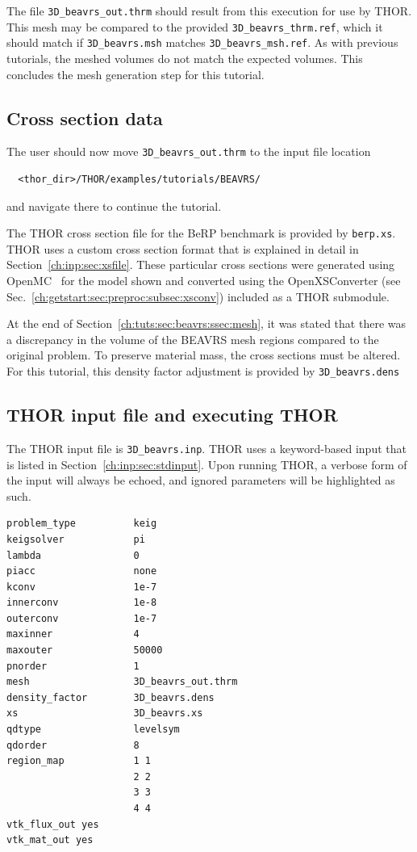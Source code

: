 The file \verb"3D_beavrs_out.thrm" should result from this execution for use by THOR.
This mesh may be compared to the provided \verb"3D_beavrs_thrm.ref", which it should match if \verb"3D_beavrs.msh" matches \verb"3D_beavrs_msh.ref".
As with previous tutorials, the meshed volumes do not match the expected volumes.
This concludes the mesh generation step for this tutorial.

\subsection{Cross section data}

The user should now move \verb"3D_beavrs_out.thrm" to the input file location
\begin{verbatim}
  <thor_dir>/THOR/examples/tutorials/BEAVRS/
\end{verbatim}
and navigate there to continue the tutorial.


The \ac{THOR} cross section file for the BeRP benchmark is provided by \verb"berp.xs".
\ac{THOR} uses a custom cross section format that is explained in detail in Section~\ref{ch:inp:sec:xsfile}.
These particular cross sections were generated using OpenMC~\cite{openmc} for the model shown and converted using the OpenXSConverter (see Sec.~\ref{ch:getstart:sec:preproc:subsec:xsconv}) included as a THOR submodule.

At the end of Section~\ref{ch:tuts:sec:beavrs:ssec:mesh}, it was stated that there was a discrepancy in the volume of the BEAVRS mesh regions compared to the original problem.
To preserve material mass, the cross sections must be altered.
For this tutorial, this density factor adjustment is provided by \verb"3D_beavrs.dens"

\subsection{THOR input file and executing THOR}

The \ac{THOR} input file is \verb"3D_beavrs.inp".
\ac{THOR} uses a keyword-based input that is listed in Section~\ref{ch:inp:sec:stdinput}.
Upon running \ac{THOR}, a verbose form of the input will always be echoed, and ignored parameters will be highlighted as such.
\begin{verbatim}
problem_type          keig
keigsolver            pi
lambda                0
piacc                 none
kconv                 1e-7
innerconv             1e-8
outerconv             1e-7
maxinner              4
maxouter              50000
pnorder               1
mesh                  3D_beavrs_out.thrm
density_factor        3D_beavrs.dens
xs                    3D_beavrs.xs
qdtype                levelsym
qdorder               8
region_map            1 1
                      2 2
                      3 3
                      4 4
vtk_flux_out yes
vtk_mat_out yes
\end{verbatim}


